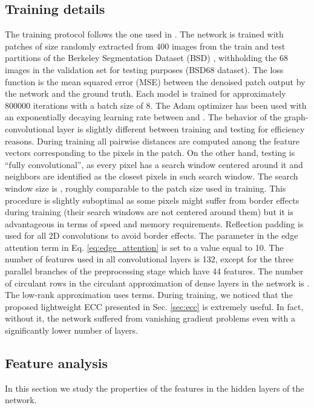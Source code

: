 \documentclass[journal]{IEEEtran}
\begin{document}
\subsection{Training details}
The training protocol follows the one used in \cite{zhang2017beyond}. The network is trained with patches of size  randomly extracted from 400 images from the train and test partitions of the Berkeley Segmentation Dataset (BSD) \cite{MartinFTM01}, withholding the 68 images in the validation set for testing purposes (BSD68 dataset). The loss function is the mean squared error (MSE) between the denoised patch output by the network and the ground truth. Each model is trained for approximately 800000 iterations with a batch size of 8. The Adam optimizer \cite{kingma2014adam} has been used with an exponentially decaying learning rate between  and . The behavior of the graph-convolutional layer is slightly different between training and testing for efficiency reasons. During training all pairwise distances are computed among the feature vectors corresponding to the pixels in the patch. On the other hand, testing is ``fully convolutional'', as every pixel has a search window centered around it and neighbors are identified as the closest pixels in such search window. The search window size is , roughly comparable to the patch size used in training. This procedure is slightly suboptimal as some pixels might suffer from border effects during training (their search windows are not centered around them) but it is advantageous in terms of speed and memory requirements. Reflection padding is used for all 2D convolutions to avoid border effects. The  parameter in the edge attention term in Eq. \eqref{eq:edge_attention} is set to a value equal to 10. The number of features used in all convolutional layers is 132, except for the three parallel branches of the preprocessing stage which have 44 features. The number of
circulant rows in the circulant approximation of dense layers in the  network is . The low-rank approximation uses  terms. During training, we noticed that the proposed lightweight ECC presented in Sec. \ref{sec:ecc} is extremely useful. In fact, without it, the network suffered from vanishing gradient problems even with a significantly lower number of layers.

\subsection{Feature analysis}
In this section we study the properties of the features in the hidden layers of the network.
\end{document}

